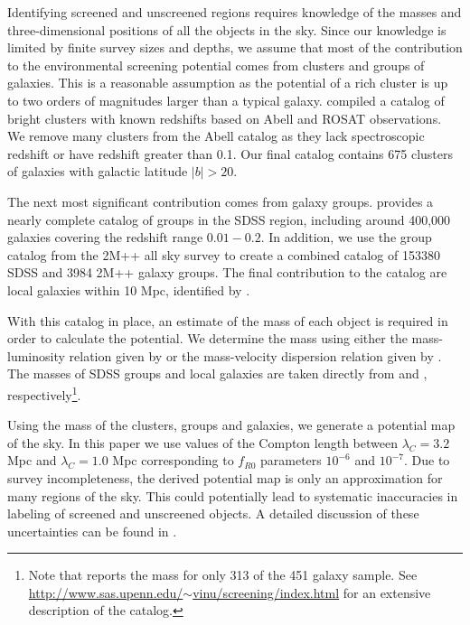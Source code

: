 \documentclass[useAMS,usenatbib,twocolumn]{mn2e}
\begin{document}
Identifying screened and unscreened regions requires knowledge of the masses and
three-dimensional positions of all the objects in the sky.
Since our knowledge is limited by finite survey sizes and depths,
we assume that most of the contribution to the environmental screening
potential comes from
clusters and groups of galaxies. This is a reasonable assumption as the
potential of a rich cluster is up to 
two orders of magnitudes larger than a typical galaxy. \citet{cabre2012}
compiled a catalog of bright clusters with known redshifts based on 
Abell \citep{abe89} and ROSAT \citep{ebe96} observations. We remove many
clusters from the Abell catalog as they lack spectroscopic
redshift or have redshift greater than 0.1. Our final catalog contains 675
clusters of galaxies with galactic latitude $\left|b\right| > 20$.

The next most significant contribution comes from galaxy groups.
\citet{yan07} provides a nearly complete catalog of groups in the SDSS region,
including around 400,000 galaxies
covering the redshift range $0.01-0.2$.
In addition, we use the group catalog from the 2M++ all
sky survey \citep{lav011} to create a combined catalog of
153380 SDSS and 3984 2M++ galaxy groups.
The final contribution to the catalog are
local galaxies within 10 Mpc, identified by \citet{kar04}. 

With this catalog in place, an estimate of the mass of each object
is required in order to calculate the potential.
We determine the mass using either the mass-luminosity relation given by
\citet{rei02} or the mass-velocity dispersion relation given by \citet{evr08}.
The masses of SDSS groups and local galaxies are taken directly from
\citet{yan07} and \citet{kar04}, respectively\footnote{Note
that \citet{kar04} reports the mass for only 313 of the 451 galaxy sample.
See \href{http://www.sas.upenn.edu/~vinu/screening/index.html}{
http://www.sas.upenn.edu/$\sim$vinu/screening/index.html} for an extensive
description of the catalog.}.

Using the mass of the clusters, groups and galaxies, we generate a
potential map of the sky.
In this paper we use values of the Compton length between $\lambda_C
= 3.2$ Mpc and  $\lambda_C = 1.0$ Mpc corresponding to $f_{R0}$ parameters
$10^{-6}$ and $10^{-7}$.  
Due to survey incompleteness, the derived potential map
is only an approximation for many regions of the sky. This could potentially
lead to systematic inaccuracies in labeling of screened and unscreened objects.
A detailed discussion of these uncertainties can be found in \citet{cabre2012}. 
 
\end{document}
